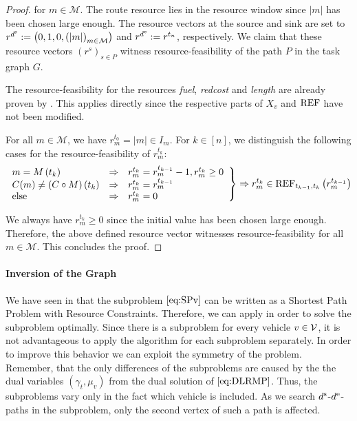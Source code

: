 \begin{proof}
for $m\in\mathcal{M}$. The route resource lies in the resource window since $\vert m\vert$ has been chosen large enough. The resource vectors at the source and sink are set to\linebreak
${r^{d^{\operatorname{s}}} := \left(0,1,0,\left(\vert m\vert\right)_{m\in\mathcal{M}}\right)}$ and ${r^{d^{\operatorname{e}}} := r^{t_n}}$, respectively. We claim that these resource vectors $\left(r^s\right)_{s\in P}$ witness resource-feasibility of the path $P$ in the task graph $G$. 

The resource-feasibility for the resources \emph{fuel}, \emph{redcost} and \emph{length} are already proven by \cite{Kaiser}. This applies directly since the respective parts of $X_v$ and $\operatorname{REF}$ have not been modified.

For all $m\in\mathcal{M}$, we have ${r^{t_0}_m = \vert m\vert\in I_m}$. For ${k\in[n]}$, we distinguish the following cases for the resource-feasibility of $r^{t_k}_m$:
\begin{align*}
	\left. \begin{array}{lll}
		m = M\left(t_k\right) & \Rightarrow & r^{t_k}_m = r^{t_{k-1}}_m - 1, r^{t_k}_m\geq 0 \\
		C(m)\neq\left(C\circ M\right)\left(t_k\right) & \Rightarrow  & r^{t_k}_m = r^{t_{k-1}}_m \\
		\text{else} & \Rightarrow & r^{t_k}_m = 0
	\end{array} \right\} \Rightarrow r^{t_k}_m\in\operatorname{REF}_{t_{k-1},t_k}\left(r^{t_{k-1}}_m\right)
\end{align*}

We always have ${r^{t_k}_m\geq 0}$ since the initial value has been chosen large enough. Therefore, the above defined resource vector witnesses resource-feasibility for all $m\in\mathcal{M}$. This concludes the proof.
%
\end{proof}

\paragraph{Inversion of the Graph} \parfill

We have seen in  that the subproblem $\eqref{eq:SPv}$ can be written as a Shortest Path Problem with Resource Constraints. Therefore, we can apply  in order to solve the subproblem optimally. Since there is a subproblem for every vehicle $v\in\mathcal{V}$, it is not advantageous to apply the algorithm for each subproblem separately. In order to improve this behavior we can exploit the symmetry of the problem. Remember, that the only differences of the subproblems are caused by the the dual variables $\left(\gamma_t,\mu_v\right)$ from the dual solution of $\eqref{eq:DLRMP}$. Thus, the subproblems vary only in the fact which vehicle is included. As we search $d^{\operatorname{s}}$-$d^{\operatorname{e}}$-paths in the subproblem, only the second vertex of such a path is affected. 


